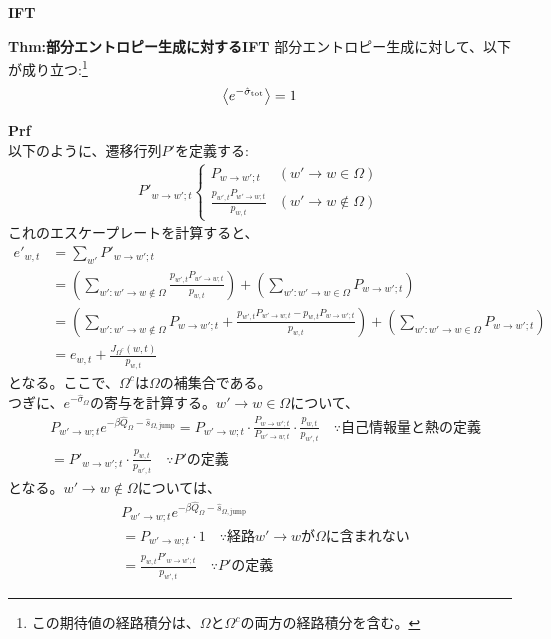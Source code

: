 \documentclass[a4paper,11pt]{jsarticle}
\numberwithin{equation}{section}
\begin{document}
\textbf{IFT}\\
\begin{itembox}[l]{\textbf{Thm:部分エントロピー生成に対するIFT}}
    部分エントロピー生成に対して、以下が成り立つ:\footnote{この期待値の経路積分は、$\Omega$と$\Omega^c$の両方の経路積分を含む。}
    \begin{align}
        \ev{e^{-\hat{\sigma}_{\text{tot}}}} = 1
    \end{align}
\end{itembox}
\textbf{Prf}\\
以下のように、遷移行列$P'$を定義する:
\begin{align}
    P'_{w \to w'; t} 
    \begin{cases}
        P_{w \to w'; t} & (w' \to w \in \Omega) \\
        \frac{p_{w',t}P_{w' \to w; t}}{p_{w,t}} & (w' \to w \notin \Omega)
    \end{cases}
\end{align}
これのエスケープレートを計算すると、
\begin{align}
    e'_{w,t} &= \sum_{w'} P'_{w \to w'; t} \\
    &= \left( \sum_{w' : w' \to w \notin \Omega} \frac{p_{w',t}P_{w' \to w; t}}{p_{w,t}}\right) + \left(\sum_{w' : w' \to w \in \Omega} P_{w \to w'; t} \right) \\
    &= \left( \sum_{w' : w' \to w \notin \Omega} P_{w \to w'; t} +\frac{p_{w',t}P_{w' \to w; t}-p_{w,t}P_{w \to w'; t}}{p_{w,t}}\right) + \left(\sum_{w' : w' \to w \in \Omega} P_{w \to w'; t} \right) \\
    &= e_{w,t} + \frac{J_{\Omega^c}(w,t)}{p_{w,t}} 
\end{align}
となる。ここで、$\Omega^c$は$\Omega$の補集合である。\\
つぎに、$e^{-\hat{\sigma}_\Omega}$の寄与を計算する。$w' \to w \in \Omega$について、
\begin{align}
    &P_{w' \to w; t} e^{-\beta \hat{Q}_{\Omega}-\hat{s}_{\Omega, \text{jump}}} = P_{w' \to w; t} \cdot \frac{P_{w \to w'; t}}{P_{w' \to w; t}} \cdot \frac{p_{w,t}}{p_{w',t}} \quad \because \text{自己情報量と熱の定義} \\
    &= P'_{w \to w'; t} \cdot \frac{p_{w,t}}{p_{w',t}} \quad \because \text{$P'$の定義} 
\end{align}
となる。$w' \to w \notin \Omega$については、
\begin{align}
    &P_{w' \to w; t} e^{-\beta \hat{Q}_{\Omega}-\hat{s}_{\Omega, \text{jump}}} \\
    &= P_{w' \to w; t} \cdot 1\quad \because \text{経路$w' \to w$が$\Omega$に含まれない} \\
    &= \frac{p_{w,t}P'_{w \to w'; t}}{p_{w',t}} \quad \because \text{$P'$の定義}
\end{align}
\end{document}
